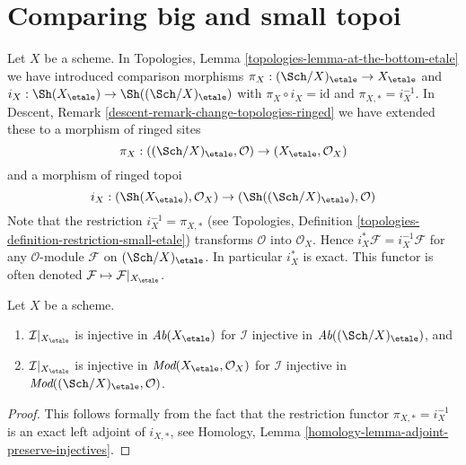 \section{Comparing big and small topoi}
\label{section-compare}

\noindent
Let $X$ be a scheme. In
Topologies, Lemma \ref{topologies-lemma-at-the-bottom-etale}
we have introduced comparison morphisms
$\pi_X : (\Sch/X)_\etale \to X_\etale$ and
$i_X : \Sh(X_\etale) \to \Sh((\Sch/X)_\etale)$
with $\pi_X \circ i_X = \text{id}$ and $\pi_{X, *} = i_X^{-1}$.
In
Descent, Remark \ref{descent-remark-change-topologies-ringed}
we have extended these to a morphism of ringed sites
$$
\pi_X : ((\Sch/X)_\etale, \mathcal{O})
\to
(X_\etale, \mathcal{O}_X)
$$
and a morphism of ringed topoi
$$
i_X : (\Sh(X_\etale), \mathcal{O}_X) \to
(\Sh((\Sch/X)_\etale), \mathcal{O})
$$
Note that the restriction $i_X^{-1} = \pi_{X, *}$ (see
Topologies, Definition \ref{topologies-definition-restriction-small-etale})
transforms $\mathcal{O}$ into $\mathcal{O}_X$. Hence
$i_X^*\mathcal{F} = i_X^{-1}\mathcal{F}$ for any $\mathcal{O}$-module
$\mathcal{F}$ on $(\Sch/X)_\etale$. In particular $i_X^*$ is
exact. This functor is often denoted
$\mathcal{F} \mapsto \mathcal{F}|_{X_\etale}$.

\begin{lemma}
\label{lemma-compare-injectives}
Let $X$ be a scheme.
\begin{enumerate}
\item $\mathcal{I}|_{X_\etale}$ is injective in
$\textit{Ab}(X_\etale)$ for $\mathcal{I}$ injective in
$\textit{Ab}((\Sch/X)_\etale)$, and
\item $\mathcal{I}|_{X_\etale}$ is injective in
$\textit{Mod}(X_\etale, \mathcal{O}_X)$
for $\mathcal{I}$ injective in
$\textit{Mod}((\Sch/X)_\etale, \mathcal{O})$.
\end{enumerate}
\end{lemma}

\begin{proof}
This follows formally from the fact that the restriction functor
$\pi_{X, *} = i_X^{-1}$ is an exact left adjoint of $i_{X, *}$, see
Homology, Lemma \ref{homology-lemma-adjoint-preserve-injectives}.
\end{proof}

